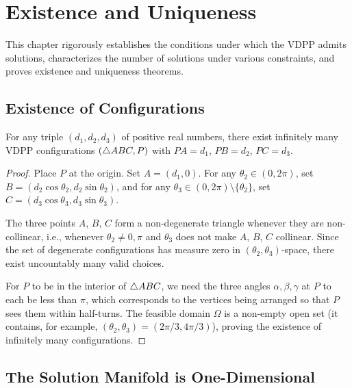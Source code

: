 
\chapter{Existence and Uniqueness}
\label{ch:existence}

This chapter rigorously establishes the conditions under which the VDPP admits solutions, characterizes the number of solutions under various constraints, and proves existence and uniqueness theorems.

\section{Existence of Configurations}

\begin{theorem}[Existence]
\label{thm:existence}
For any triple $(d_1, d_2, d_3)$ of positive real numbers, there exist infinitely many VDPP configurations $(\triangle ABC, P)$ with $PA = d_1$, $PB = d_2$, $PC = d_3$.
\end{theorem}

\begin{proof}
Place $P$ at the origin. Set $A = (d_1, 0)$. For any $\theta_2 \in (0, 2\pi)$, set $B = (d_2\cos\theta_2, d_2\sin\theta_2)$, and for any $\theta_3 \in (0, 2\pi) \setminus \{\theta_2\}$, set $C = (d_3\cos\theta_3, d_3\sin\theta_3)$.

The three points $A$, $B$, $C$ form a non-degenerate triangle whenever they are non-collinear, i.e., whenever $\theta_2 \neq 0, \pi$ and $\theta_3$ does not make $A$, $B$, $C$ collinear. Since the set of degenerate configurations has measure zero in $(\theta_2, \theta_3)$-space, there exist uncountably many valid choices.

For $P$ to be in the interior of $\triangle ABC$, we need the three angles $\alpha, \beta, \gamma$ at $P$ to each be less than $\pi$, which corresponds to the vertices being arranged so that $P$ sees them within half-turns. The feasible domain $\Omega$ is a non-empty open set (it contains, for example, $(\theta_2, \theta_3) = (2\pi/3, 4\pi/3)$), proving the existence of infinitely many configurations.
\end{proof}

\section{The Solution Manifold is One-Dimensional}

